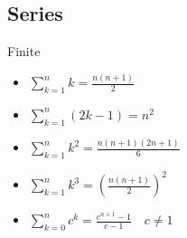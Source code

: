 \documentclass[landscape]{article}
\begin{document}
\begin{multicols*}{2}
%
%
%
%
%
%
%
%

\subsection{Series}

\begin{multicols}{2}
Finite
\begin{itemize}
  \item $\displaystyle\sum_{k=1}^n k = \frac{n(n+1)}{2}$
  \item $\displaystyle\sum_{k=1}^n (2k-1) = n^2$
  \item $\displaystyle\sum_{k=1}^n k^2 = \frac{n(n+1)(2n+1)}{6}$
  \item $\displaystyle\sum_{k=1}^n k^3 = \left(\frac{n(n+1)}{2}\right)^2$
  \item $\displaystyle\sum_{k=0}^n c^k = \frac{c^{n+1}-1}{c-1} \quad c\neq1$
\end{itemize}


\end{multicols}
\end{multicols*}
\end{document}
